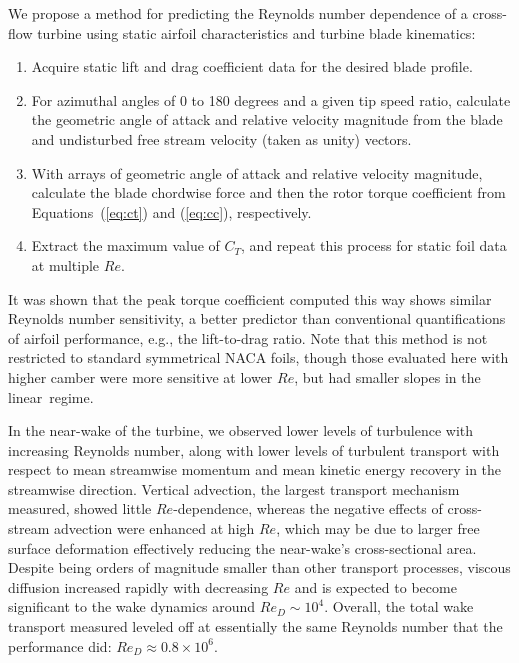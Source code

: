 \documentclass[energies,article,accept,moreauthors,pdftex,10pt,a4paper]{mdpi}
\theoremstyle{mdpi}
\newcounter{ex}
\newcounter{re}
\begin{document}
We propose a method for predicting the Reynolds number dependence of a cross-flow
turbine using static airfoil characteristics and turbine blade kinematics:
\begin{enumerate}
    \item Acquire static lift and drag coefficient data for the desired blade
    profile.

    \item For azimuthal angles of 0 to 180 degrees and a given tip speed ratio,
    calculate the geometric angle of attack and relative velocity magnitude from
    the blade and undisturbed free stream velocity (taken as unity) vectors.

    \item With arrays of geometric angle of attack and relative velocity
    magnitude, calculate the blade chordwise force and then the rotor torque
    coefficient from Equations~(\ref{eq:ct}) and (\ref{eq:cc}), respectively.

    \item Extract the maximum value of $C_T$, and repeat this process for static
    foil data at multiple $Re$.
\end{enumerate}

It was shown that the peak torque coefficient computed this way shows similar
Reynolds number sensitivity, a better predictor than conventional
quantifications of airfoil performance, e.g., the lift-to-drag ratio. Note that this
method is not restricted to standard symmetrical NACA foils, though those
evaluated here with higher camber were more sensitive at lower $Re$, but had
smaller slopes in the linear~regime.

In the near-wake of the turbine, we observed lower levels of turbulence with
increasing Reynolds number, along with lower levels of turbulent transport with
respect to mean streamwise momentum and mean kinetic energy recovery in the
streamwise direction. Vertical advection, the largest transport mechanism
measured, showed little $Re$-dependence, whereas the negative effects of
cross-stream advection were enhanced at high $Re$, which may be due to larger
free surface deformation effectively reducing the near-wake's cross-sectional
area. Despite being orders of magnitude smaller than other transport processes,
viscous diffusion increased rapidly with decreasing $Re$ and is expected to
become significant to the wake dynamics around $Re_D \sim 10^4$. Overall, the
total wake transport measured leveled off at essentially the same Reynolds
number that the performance did: $Re_D \approx 0.8 \times 10^6$.
\end{document}

